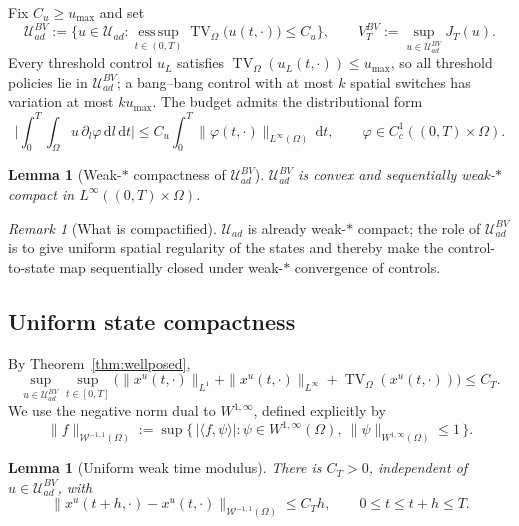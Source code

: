 \documentclass[pdflatex,sn-mathphys-num]{sn-jnl}
\newcommand{\Om}{\Omega}
\newcommand{\dd}{\,\mathrm{d}}
\newcommand{\Uad}{\mathcal{U}_{ad}}
\newcommand{\UadBV}{\mathcal{U}_{ad}^{BV}}
\DeclareMathOperator{\TV}{TV}
\theoremstyle{plain}
\newtheorem{lemma}[theorem]{Lemma}
\theoremstyle{definition}
\theoremstyle{remark}
\newtheorem{remark}[theorem]{Remark}
\begin{document}
Fix $C_u\ge u_{\max}$ and set
\[
\UadBV:=\Big\{u\in\Uad:
\operatorname*{ess\,sup}_{t\in(0,T)}\TV_\Om\big(u(t,\cdot)\big)\le C_u\Big\},
\qquad
V_T^{BV}:=\sup_{u\in\UadBV}J_T(u).
\]
Every threshold control $u_L$ satisfies $\TV_\Om(u_L(t,\cdot))\le u_{\max}$, so all
threshold policies lie in $\UadBV$; a bang--bang control with at most $k$ spatial
switches has variation at most $ku_{\max}$. The budget admits the distributional
form
\begin{equation}\label{eq:TV_distributional}
\Big|\int_0^T\!\!\int_\Om u\,\partial_l\varphi\dd l\dd t\Big|
\le C_u\int_0^T\|\varphi(t,\cdot)\|_{L^\infty(\Om)}\dd t,
\qquad \varphi\in C_c^1((0,T)\times\Om).
\end{equation}

\begin{lemma}[Weak-$\ast$ compactness of $\UadBV$]
\label{lem:UadBV_compact}
$\UadBV$ is convex and sequentially weak-$\ast$ compact in
$L^\infty((0,T)\times\Om)$.
\end{lemma}

\begin{remark}[What is compactified]
\label{rmk:what_compactified}
$\Uad$ is already weak-$\ast$ compact; the role of $\UadBV$ is to give uniform
spatial regularity of the states and thereby make the control-to-state map
sequentially closed under weak-$\ast$ convergence of controls.
\end{remark}

\subsection{Uniform state compactness}
\label{subsec:state_compactness}

By Theorem~\ref{thm:wellposed},
\begin{equation}\label{eq:uniform_state_BV}
\sup_{u\in\UadBV}\sup_{t\in[0,T]}
\big(\|x^u(t,\cdot)\|_{L^1}+\|x^u(t,\cdot)\|_{L^\infty}+\TV_\Om(x^u(t,\cdot))\big)
\le C_T.
\end{equation}
We use the negative norm dual to $W^{1,\infty}$, defined explicitly by
\[
\|f\|_{\mathcal W^{-1,1}(\Om)}
:=\sup\Big\{\,|\langle f,\psi\rangle|:\psi\in W^{1,\infty}(\Om),\
\|\psi\|_{W^{1,\infty}(\Om)}\le1\,\Big\}.
\]

\begin{lemma}[Uniform weak time modulus]
\label{lem:weak_time_modulus}
There is $C_T>0$, independent of $u\in\UadBV$, with
\begin{equation}\label{eq:weak_time_estimate}
\|x^u(t+h,\cdot)-x^u(t,\cdot)\|_{\mathcal W^{-1,1}(\Om)}\le C_T h,
\qquad 0\le t\le t+h\le T.
\end{equation}
\end{lemma}
\end{document}
